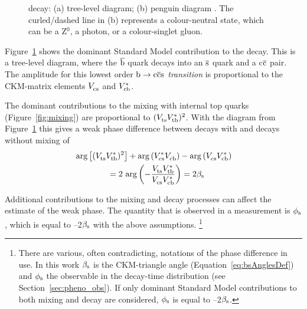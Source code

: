 \begin{figure}[hbt]
  \centering
  \begin{subfigure}{0.5\textwidth}
    \centering
    
    \caption{}
    \label{fig:decay_tree}
  \end{subfigure}%
  \begin{subfigure}{0.5\textwidth}
    \centering
    
    \caption{}
    \label{fig:decay_penguin}
  \end{subfigure}
  \caption{\BstoJpsiphi{} decay: (a) tree-level diagram; (b) penguin diagram \cite{LHCb-PAPER-2013-002}. The curled/dashed line in (b)
           represents a colour-neutral state, which can be a Z$^0$, a photon, or a colour-singlet gluon.}
  \label{fig:decay}
\end{figure}
Figure~\ref{fig:decay_tree} shows the dominant Standard Model contribution to the \BstoJpsiphi{} decay. This is a tree-level diagram,
where the $\qbar[b]$ quark decays into an $\qbar[s]$ quark and a c$\qbar[c]$ pair. The amplitude for this lowest order \emph{$\btoccs$
transition} is proportional to the CKM-matrix elements $\Vcs$ and $\Vcb[*]$.

The dominant contributions to the \BsBsbar{} mixing with internal top quarks (Figure~\ref{fig:mixing}) are proportional to
$(\Vts\Vtb[*])^2$. With the diagram from Figure~\ref{fig:decay_tree} this gives a weak phase difference between decays with and decays
without mixing of
\begin{equation}
  \label{eq:betasCKM}
  \begin{split}
    &\arg\left[(\Vts\Vtb[*])^2\right] + \arg\left(\Vcs[*]\Vcb\right) - \arg\left(\Vcs\Vcb[*]\right) \\
    &\qquad\qquad= 2\,\arg\left(-\frac{\Vts\Vtb[*]}{\Vcs\Vcb[*]}\right) = 2\bs
  \end{split}
\end{equation}

Additional contributions to the mixing and decay processes can affect the estimate of the weak phase. The quantity that is observed in a
measurement is $\phis$, which is equal to --2$\bs$ with the above assumptions.%
\footnote{There are various, often contradicting, notations of the phase difference in use. In this work $\bs$ is the CKM-triangle angle
(Equation~\ref{eq:bsAnglesDef}) and $\phis$ the observable in the decay-time distribution (see Section~\ref{sec:pheno_obs}). If only
dominant Standard Model contributions to both mixing and decay are considered, $\phis$ is equal to --2$\bs$.}

